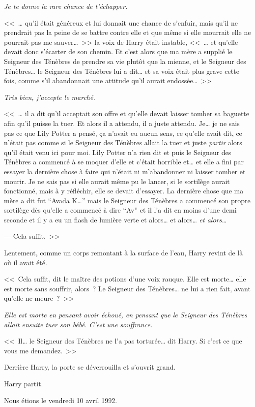 \emph{Je te donne la rare chance de t'échapper.}

<<~… qu'il était généreux et lui donnait une chance de s'enfuir, mais qu'il ne prendrait pas la peine de se battre contre elle et que même si elle mourrait elle ne pourrait pas me sauver…~>> la voix de Harry était instable, <<~… et qu'elle devait donc s'écarter de son chemin. Et c'est alors que ma mère a supplié le Seigneur des Ténèbres de prendre sa vie plutôt que la mienne, et le Seigneur des Ténèbres… le Seigneur des Ténèbres lui a dit… et sa voix était plus grave cette fois, comme s'il abandonnait une attitude qu'il aurait endossée…~>>

\emph{Très bien, j'accepte le marché.}

<<~… il a dit qu'il acceptait son offre et qu'elle devait laisser tomber sa baguette afin qu'il puisse la tuer. Et alors il a attendu, il a juste attendu. Je… je ne sais pas ce que Lily Potter a pensé, ça n'avait eu aucun sens, ce qu'elle avait dit, ce n'était pas comme si le Seigneur des Ténèbres allait la tuer et juste \emph{partir} alors qu'il était venu ici pour moi. Lily Potter n'a rien dit et puis le Seigneur des Ténèbres a commencé à se moquer d'elle et c'était horrible et… et elle a fini par essayer la dernière chose à faire qui n'était ni m'abandonner ni laisser tomber et mourir. Je ne sais pas si elle aurait même pu le lancer, si le sortilège aurait fonctionné, mais à y réfléchir, elle se devait d'essayer. La dernière chose que ma mère a dit fut “Avada K…” mais le Seigneur des Ténèbres a commencé son propre sortilège dès qu'elle a commencé à dire “Av” et il l'a dit en moins d'une demi seconde et il y a eu un flash de lumière verte et alors… et alors… \emph{et alors…}

--- Cela suffit.~>>

Lentement, comme un corps remontant à la surface de l'eau, Harry revint de là où il avait été.

<<~Cela suffit, dit le maître des potions d'une voix rauque. Elle est morte… elle est morte sans souffrir, alors~? Le Seigneur des Ténèbres… ne lui a rien fait, avant qu'elle ne meure~?~>>

\emph{Elle est morte en pensant avoir échoué, en pensant que le Seigneur des Ténèbres allait ensuite tuer son bébé. C'est une souffrance.}

<<~Il… le Seigneur des Ténèbres ne l'a pas torturée… dit Harry. Si c'est ce que vous me demandez.~>>

Derrière Harry, la porte se déverrouilla et s'ouvrit grand.

Harry partit.

Nous étions le vendredi 10 avril 1992.
